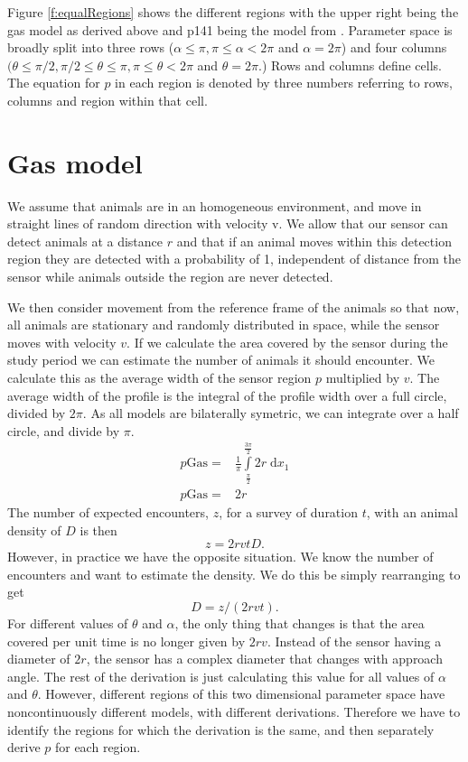 Figure \ref{f:equalRegions} shows the different regions with the upper right being the gas model as derived above and p141 being the model from \citep{rowcliffe2008estimating}. Parameter space is broadly split into three rows ($\alpha \le \pi, \pi \le \alpha < 2\pi$ and $\alpha = 2\pi$) and four columns $(\theta \le \pi/2,  \pi/2 \le \theta \le \pi,  \pi \le \theta < 2\pi$ and $\theta = 2\pi$.) Rows and columns define cells. The equation for $p$ in each region is denoted by three numbers referring to rows, columns and region within that cell.


\section{Gas model} \label{gas}

We assume that animals are in an homogeneous environment, and move in straight lines of random direction with velocity v. We allow that our sensor can detect animals at a distance $r$ and that if an animal moves within this detection region they are detected with a probability of 1, independent of distance from the sensor while animals outside the region are never detected.

We then consider movement from the reference frame of the animals so that now, all animals are stationary and randomly distributed in space, while the sensor moves with velocity $v$. If we calculate the area covered by the sensor during the study period we can estimate the number of animals it should encounter. We calculate this as the average width of the sensor region $p$ multiplied by $v$. The average width of the profile is the integral of the profile width over a full circle, divided by $2\pi$. As all models are bilaterally symetric, we can integrate over a half circle, and divide by $\pi$.
\begin{align}
p\text{Gas} =& \frac{1}{\pi}\int\limits_{\frac{\pi}{2}}^{\frac{3\pi}{2}} 2r \; \mathrm{d}x_1\\
p\text{Gas} =& 2r
\end{align}
The number of expected encounters, $z$, for a survey of duration $t$, with an animal density of $D$ is then
\begin{equation}
	z = 2rvtD.
\end{equation}
However, in practice we have the opposite situation. We know the number of encounters and want to estimate the density. We do this be simply rearranging to get
\begin{equation}
	D = z/(2rvt).
\end{equation}
For different values of $\theta$ and $\alpha$, the only thing that changes is that the area covered per unit time is no longer given by $2rv$. Instead of the sensor having a diameter of $2r$, the sensor has a complex diameter that changes with approach angle. The rest of the derivation is just calculating this value for all values of $\alpha$ and $\theta$. However, different regions of this two dimensional parameter space have noncontinuously different models, with different derivations. Therefore we have to identify the regions for which the derivation is the same, and then separately derive $p$ for each region.


